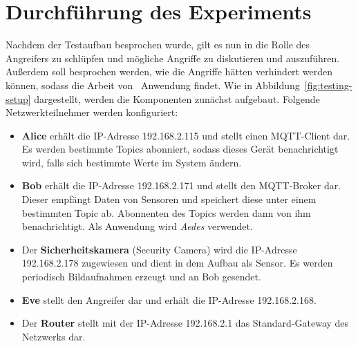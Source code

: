 \section{Durchführung des Experiments}
Nachdem der Testaufbau besprochen wurde, gilt es nun in die Rolle des Angreifers
zu schlüpfen und mögliche Angriffe zu diskutieren und auszuführen. Außerdem soll
besprochen werden, wie die Angriffe hätten verhindert werden können, sodass die
Arbeit von~\cite{paper} Anwendung findet. Wie in
Abbildung~\ref{fig:testing-setup} dargestellt, werden die Komponenten zunächst
aufgebaut. Folgende Netzwerkteilnehmer werden konfiguriert:

\begin{itemize}
  \item \textbf{Alice} erhält die IP-Adresse 192.168.2.115 und stellt einen
    MQTT-Client dar. Es werden bestimmte Topics abonniert, sodass dieses Gerät
    benachrichtigt wird, falls sich bestimmte Werte im System ändern.
  \item \textbf{Bob} erhält die IP-Adresse 192.168.2.171 und stellt den
    MQTT-Broker dar. Dieser empfängt Daten von Sensoren und speichert diese
    unter einem bestimmten Topic ab. Abonnenten des Topics werden dann von ihm
    benachrichtigt. Als Anwendung wird \textit{Aedes} verwendet.
  \item Der \textbf{Sicherheitskamera} (Security Camera) wird die IP-Adresse
    192.168.2.178 zugewiesen und dient in dem Aufbau als Sensor. Es werden
    periodisch Bildaufnahmen erzeugt und an Bob gesendet.
  \item \textbf{Eve} stellt den Angreifer dar und erhält die IP-Adresse
    192.168.2.168.
  \item Der \textbf{Router} stellt mit der IP-Adresse 192.168.2.1 das
    Standard-Gateway des Netzwerks dar.
\end{itemize}

